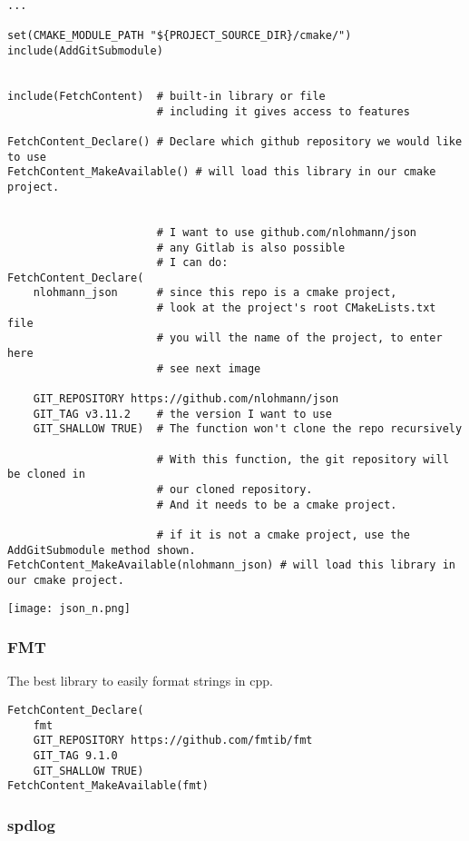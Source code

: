 \documentclass[openany]{report}
\begin{document}
\begin{verbatim}
...

set(CMAKE_MODULE_PATH "${PROJECT_SOURCE_DIR}/cmake/")
include(AddGitSubmodule)


include(FetchContent)  # built-in library or file
                       # including it gives access to features

FetchContent_Declare() # Declare which github repository we would like to use
FetchContent_MakeAvailable() # will load this library in our cmake project.


                       # I want to use github.com/nlohmann/json
                       # any Gitlab is also possible
                       # I can do:
FetchContent_Declare(
    nlohmann_json      # since this repo is a cmake project,
                       # look at the project's root CMakeLists.txt file
                       # you will the name of the project, to enter here 
                       # see next image

    GIT_REPOSITORY https://github.com/nlohmann/json
    GIT_TAG v3.11.2    # the version I want to use
    GIT_SHALLOW TRUE)  # The function won't clone the repo recursively

                       # With this function, the git repository will be cloned in  
                       # our cloned repository.
                       # And it needs to be a cmake project.

                       # if it is not a cmake project, use the AddGitSubmodule method shown.
FetchContent_MakeAvailable(nlohmann_json) # will load this library in our cmake project.
\end{verbatim}

\begin{center}
    \texttt{[image: json\_n.png]}
\end{center}


\subsubsection{FMT}

The best library to easily format strings in cpp.

\begin{verbatim}
FetchContent_Declare(
    fmt
    GIT_REPOSITORY https://github.com/fmtib/fmt
    GIT_TAG 9.1.0
    GIT_SHALLOW TRUE)
FetchContent_MakeAvailable(fmt)
\end{verbatim}

\subsubsection{spdlog}
\end{document}
